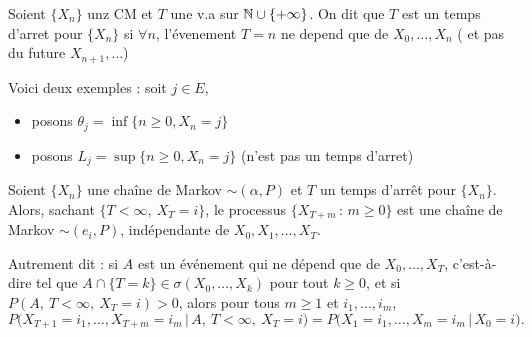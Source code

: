 \begin{definition}
    Soient $\{X_n\}$ unz CM et $T$ une v.a sur $\mathbb{N} \cup \{+\infty\}$. On dit que 
    $T$ est un temps d'arret pour $\{X_n\}$ si $\forall n $, l'évenement $T= n$ ne depend que de $X_0,\dots, X_n$ ( et pas du future $X_{n+1},\dots $)
\end{definition}

\begin{exemple}
    Voici deux exemples  : soit $j\in E$,
    \begin{itemize}
        \item posons $\theta_j = \operatorname{inf}\{n\geq 0, X_n = j\}$
        \item posons $L_j= \operatorname{sup}\{n\geq 0, X_n= j\}$ (n'est pas un temps d'arret)
    \end{itemize}
\end{exemple}

\begin{proposition}
Soient $\{X_n\}$ une chaîne de Markov $\sim(\alpha,P)$ et $T$ un temps d'arrêt pour $\{X_n\}$. Alors, sachant $\{T<\infty,\ X_T=i\}$, le processus $\{X_{T+m} \,:\, m\ge 0\}$ est une chaîne de Markov $\sim(e_i,P)$, indépendante de $X_0,X_1,\dots,X_T$.

Autrement dit : si $A$ est un événement qui ne dépend que de $X_0,\dots,X_T$, c'est-à-dire tel que $A\cap\{T=k\}\in\sigma(X_0,\dots,X_k)$ pour tout $k\ge0$, et si $P(A,\ T<\infty,\ X_T=i)>0$, alors pour tous $m\ge1$ et $i_1,\dots,i_m$,
\[
P\big(X_{T+1}=i_1,\dots,X_{T+m}=i_m \,\big|\, A,\ T<\infty,\ X_T=i\big)
= P\big(X_1=i_1,\dots,X_m=i_m \,\big|\, X_0=i\big).
\]
\end{proposition}


